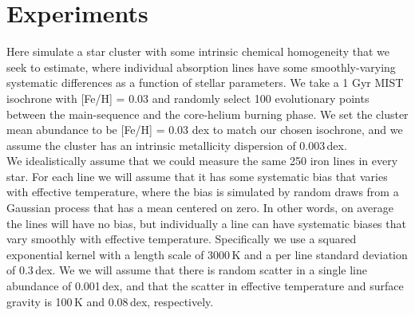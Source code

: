 \documentclass[modern]{aastex631}
\begin{document}

\section{Experiments} \label{sec:experiments}

Here simulate a star cluster with some intrinsic chemical homogeneity that we seek to estimate, where individual absorption lines have some smoothly-varying systematic differences as a function of stellar parameters. We take a 1 Gyr MIST isochrone with [Fe/H] = 0.03 and randomly select 100 evolutionary points between the main-sequence and the core-helium burning phase. We set the cluster mean abundance to be [Fe/H] = 0.03 dex to match our chosen isochrone, and we assume the cluster has an intrinsic metallicity dispersion of 0.003\,dex.\\

We idealistically assume that we could measure the same 250 iron lines in every star. For each line we will assume that it has some systematic bias that varies with effective temperature, where the bias is simulated by random draws from a Gaussian process that has a mean centered on zero. In other words, on average the lines will have no bias, but individually a line can have systematic biases that vary smoothly with effective temperature. Specifically we use a squared exponential kernel with a length scale of 3000\,K and a per line standard deviation of 0.3\,dex. We we will assume that there is random scatter in a single line abundance of 0.001\,dex, and that the scatter in effective temperature and surface gravity is 100\,K and 0.08\,dex, respectively.\\
\end{document}
